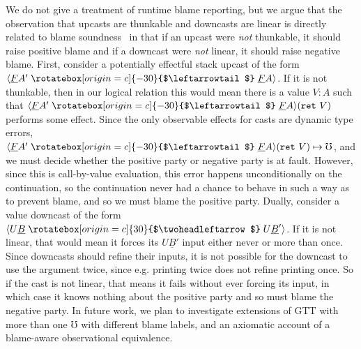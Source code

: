 \documentclass[acmsmall,screen,12pt]{acmart}
\newif\iflong
\renewcommand{\u}{\underline}
\newcommand{\uarrow}{\mathrel{\rotatebox[origin=c]{-30}{$\leftarrowtail$}}}
\newcommand{\darrow}{\mathrel{\rotatebox[origin=c]{30}{$\twoheadleftarrow$}}}
\newcommand{\upcast}[2]{\langle{#2}\uarrow{#1}\rangle}
\newcommand{\dncast}[2]{\langle{#1}\darrow{#2}\rangle}
\newcommand{\err}{\mho}
\newcommand{\kw}[1]{\texttt{#1}\,\,}
\newcommand{\ret}{\kw{ret}}
\begin{document}
{\iflong \paragraph{Blame}
\fi
We do not give a treatment of runtime blame reporting, but we argue that
the observation that upcasts are thunkable and downcasts are linear is
directly related to blame soundness~\cite{tobin-hochstadt06,wadler-findler09} in that if
an upcast were \emph{not} thunkable, it should raise positive blame and
if a downcast were \emph{not} linear, it should raise negative blame.
%
First, consider a potentially effectful stack upcast of the form
$\upcast{\u F A}{\u F A'}$. If it is not thunkable, then in our logical
relation this would mean there is a value $V : A$ such that $\upcast{\u
  F A}{\u F A'}(\ret V)$ performs some effect.
%
Since the only observable effects for casts are dynamic type errors, 
$\upcast{\u F A}{\u F A'}(\ret V) \mapsto \err$, and we must decide
whether the positive party or negative party is at fault.
%
However, since this is call-by-value evaluation, this error happens
unconditionally on the continuation, so the continuation never had a
chance to behave in such a way as to prevent blame, and so we must blame the
positive party.
%
Dually, consider a value downcast of the form $\dncast{U \u B}{U \u B'}$.
If it is not linear, that would mean it forces its $U \u B'$
input either never or more than once.
%
Since downcasts should refine their inputs, it is not possible for
the downcast to use the argument twice, since e.g. printing twice does not
refine printing once.
%
So if the cast is not linear, that means it fails without ever forcing
its input, in which case it knows nothing about the positive party and
so must blame the negative party.
%
In future work, we plan to investigate extensions of GTT with more than
one $\err$ with different blame labels, and an axiomatic account of
a blame-aware observational equivalence.



}
\end{document}
